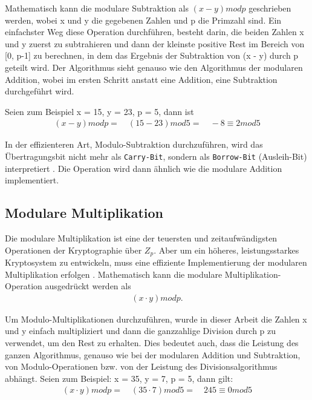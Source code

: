 Mathematisch kann die modulare Subtraktion als $ (x - y) mod p $ geschrieben
werden, wobei x und y die gegebenen Zahlen und p die Primzahl sind. 
Ein einfachster Weg diese Operation durchführen, besteht darin, die beiden Zahlen x
und y zuerst zu subtrahieren und dann der kleinste positive Rest im Bereich von [0, p-1] zu berechnen, in dem das Ergebnis
der Subtraktion von (x - y) durch p geteilt wird. Der Algorithmus sieht genauso wie den Algorithmus der modularen Addition, wobei im ersten Schritt anstatt eine Addition, eine Subtraktion durchgeführt wird.

Seien zum Beispiel x = 15, y = 23, p = 5, dann ist
\begin{align*}
    (x - y) mod p = \quad (15-23) mod 5 = \quad -8 \equiv 2 mod 5
\end{align*}

In der effizienteren Art, Modulo-Subtraktion durchzuführen, wird das Übertragungsbit nicht mehr als \texttt{Carry-Bit}, sondern als \texttt{Borrow-Bit} (Ausleih-Bit) interpretiert \cite{nist}. Die Operation wird dann ähnlich wie die modulare Addition implementiert.  

\subsection{Modulare Multiplikation}


Die modulare Multiplikation ist eine der teuersten und zeitaufwändigsten
Operationen der Kryptographie über $ Z_p$. Aber um ein höheres, leistungsstarkes Kryptosystem zu entwickeln,
muss eine effiziente Implementierung der modularen Multiplikation erfolgen \cite{Hossain2019}. 
Mathematisch kann die modulare Multiplikation-Operation ausgedrückt werden als
\begin{align*}
    (x \cdot y) mod p.
\end{align*} 

Um Modulo-Multiplikationen durchzuführen, wurde in dieser Arbeit die Zahlen x und y einfach multipliziert und dann die ganzzahlige Division durch p zu verwendet, um den Rest zu erhalten.
Dies bedeutet auch, dass die Leistung des ganzen Algorithmus, genauso wie bei der modularen Addition und Subtraktion, von Modulo-Operationen bzw. von der Leistung des Divisionsalgorithmus abhängt.
Seien zum Beispiel: x = 35, y = 7, p = 5, dann gilt:
\begin{align*}
    (x \cdot y) mod p = \quad (35 \cdot 7) mod 5 = \quad 245 \equiv 0 mod 5
\end{align*}

